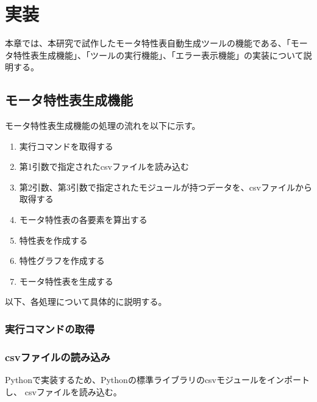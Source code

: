 \chapter{実装}\label{cha:Implementation}

本章では、本研究で試作したモータ特性表自動生成ツールの機能である、「モータ特性表生成機能」、「ツールの実行機能」、「エラー表示機能」の実装について説明する。\\




\section{モータ特性表生成機能}\label{tokuseisei}
モータ特性表生成機能の処理の流れを以下に示す。
\begin{enumerate}
    \item 実行コマンドを取得する
    \item 第1引数で指定されたcsvファイルを読み込む
    \item 第2引数、第3引数で指定されたモジュールが持つデータを、csvファイルから取得する
    \item モータ特性表の各要素を算出する
    \item 特性表を作成する
    \item 特性グラフを作成する
    \item モータ特性表を生成する
\end{enumerate}

以下、各処理について具体的に説明する。

\subsection{実行コマンドの取得}\label{sub:comandget}

\subsection{csvファイルの読み込み}\label{sub:csvfairu}
Pythonで実装するため、Pythonの標準ライブラリのcsvモジュールをインポートし、
csvファイルを読み込む。

